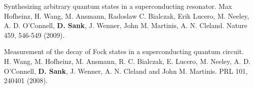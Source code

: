 \documentclass[margin=2cm,line]{res}
\newenvironment{list3}{
  \begin{list}{}{%
      \setlength{\itemsep}{0in}
      \setlength{\parsep}{0in} \setlength{\parskip}{0in}
      \setlength{\topsep}{0in} \setlength{\partopsep}{0in}
      \setlength{\leftmargin}{0.2in}}}{\end{list}}
\begin{document}
\begin{resume}
\begin{list3}
\item Synthesizing arbitrary quantum states in a superconducting resonator. Max Hofheinz, H. Wang, M. Ansmann, Radoslaw C. Bialczak, Erik Lucero, M. Neeley, A. D. O'Connell, \textbf{D. Sank}, J. Wenner, John M. Martinis, A. N. Cleland. Nature 459, 546-549 (2009). \\

\item Measurement of the decay of Fock states in a superconducting quantum circuit. H. Wang, M. Hofheinz, M. Ansmann, R. C. Bialczak, E. Lucero, M. Neeley, A. D. O'Connell, \textbf{D. Sank}, J. Wenner, A. N. Cleland and John M. Martinis. PRL 101, 240401 (2008).
\\
\end{list3}


\end{resume}
\end{document}

